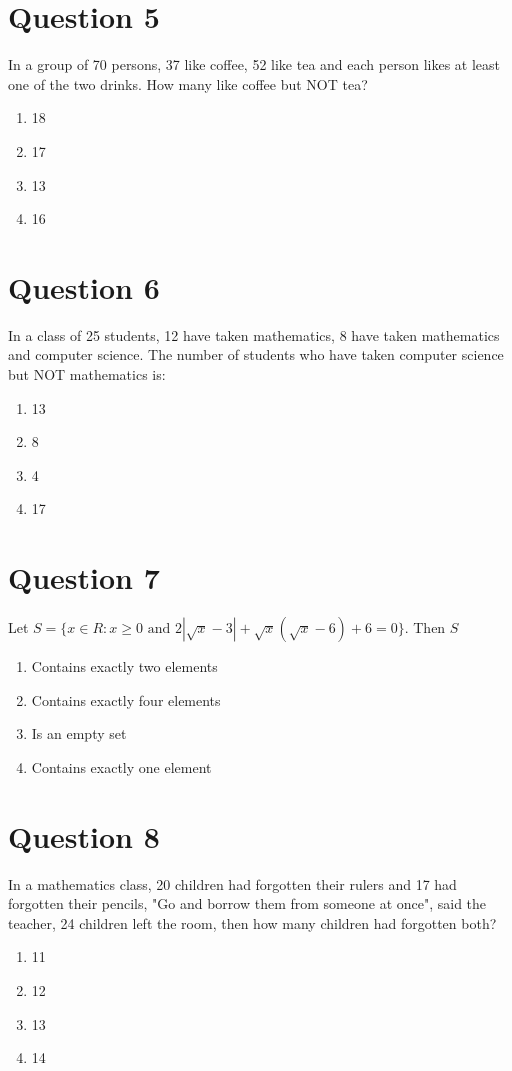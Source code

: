 \documentclass{article}
\begin{document}
\section*{Question 5}
In a group of 70 persons, 37 like coffee, 52 like tea and each person likes at least one of the two drinks. How many like coffee but NOT tea?
\begin{enumerate}[label=(\alph*)]
\item 18
\item 17
\item 13
\item 16
\end{enumerate}
\newpage
\section*{Question 6}
In a class of 25 students, 12 have taken mathematics, 8 have taken mathematics and computer science. The number of students who have taken computer science but NOT mathematics is:
\begin{enumerate}[label=(\alph*)]
\item 13
\item 8
\item 4
\item 17
\end{enumerate}
\newpage
\section*{Question 7}
Let \(S=\{x \in R: x \geq 0 \text { and } 2|\sqrt{x}-3|+\sqrt{x}(\sqrt{x}-6)+6=0\} .\) Then \(S\)
\begin{enumerate}[label=(\alph*)]
\item Contains exactly two elements
\item Contains exactly four elements
\item Is an empty set
\item Contains exactly one element
\end{enumerate}
\newpage
\section*{Question 8}
In a mathematics class, 20 children had forgotten their rulers and 17 had forgotten their pencils, "Go and borrow them from someone at once", said the teacher, 24 children left the room, then how many children had forgotten both?\newline
\begin{enumerate}[label=(\alph*)]
\item 11
\item 12
\item 13
\item 14
\end{enumerate}
\newpage
\end{document}
